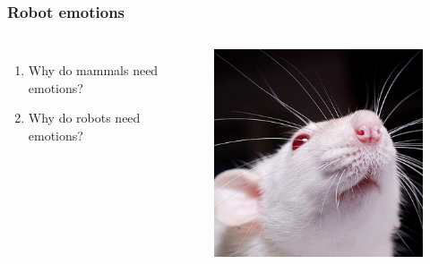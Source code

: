 \documentclass[12pt, aspectratio=169]{beamer}
\begin{document}
\begin{frame}
\frametitle{Robot emotions}
\begin{columns}[c] %

\begin{enumerate}
\item Why do mammals need emotions?
\item Why do robots need emotions?
\end{enumerate}

\begin{figure}
\includegraphics[width=1.0\linewidth]{rat}
\end{figure}


\end{columns}
\end{frame}
\end{document}

